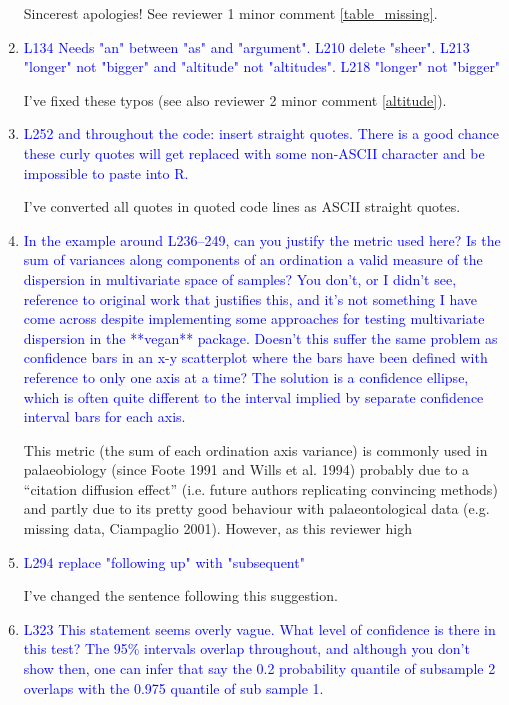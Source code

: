 \documentclass[12pt,letterpaper]{article}
\begin{document}
\begin{enumerate}
Sincerest apologies! See reviewer 1 minor comment \ref{table_missing}.

\item{\textcolor{blue}{L134 Needs "an" between "as" and "argument". L210 delete "sheer". L213 "longer" not "bigger" and "altitude" not "altitudes". L218 "longer" not "bigger"}}

I've fixed these typos (see also reviewer 2 minor comment \ref{altitude}).

\item{\textcolor{blue}{L252 and throughout the code: insert straight quotes. There is a good chance these curly quotes will get replaced with some non-ASCII character and be impossible to paste into R.}}

I've converted all quotes in quoted code lines as ASCII straight quotes.

\item{\textcolor{blue}{In the example around L236--249, can you justify the metric used here? Is the sum of variances along components of an ordination a valid measure of the dispersion in multivariate space of samples? You don't, or I didn't see, reference to original work that justifies this, and it's not something I have come across despite implementing some approaches for testing multivariate dispersion in the **vegan** package. Doesn't this suffer the same problem as confidence bars in an x-y scatterplot where the bars have been defined with reference to only one axis at a time? The solution is a confidence ellipse, which is often quite different to the interval implied by separate confidence interval bars for each axis.}}

This metric (the sum of each ordination axis variance) is commonly used in palaeobiology (since Foote 1991 and Wills et al. 1994) probably due to a ``citation diffusion effect'' (i.e. future authors replicating convincing methods) and partly due to its pretty good behaviour with palaeontological data (e.g. missing data, Ciampaglio 2001).
However, as this reviewer high


\item{\textcolor{blue}{L294 replace "following up" with "subsequent"}}

I've changed the sentence following this suggestion.

\item{\textcolor{blue}{L323 This statement seems overly vague. What level of confidence is there in this test? The 95\% intervals overlap throughout, and although you don't show then, one can infer that say the 0.2 probability quantile of subsample 2 overlaps with the 0.975 quantile of sub sample 1.}}


\end{enumerate}
\end{document}
